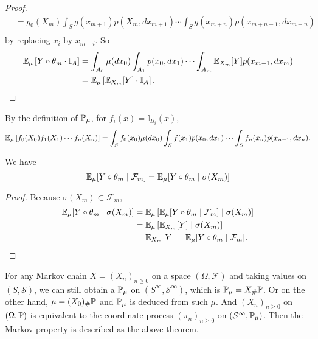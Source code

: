 \begin{proof}
\begin{equation*}
\begin{aligned}
            &=  g_0(X_m)\int_S g(x_{m+1})p(X_m,dx_{m+1}) \cdots \int_S g(x_{m+n})p(x_{m+n-1},dx_{m+n}) \\
        \end{aligned}
    \end{equation*}
    by replacing $x_i$ by $x_{m+i}$. So
    \begin{equation*}
        \begin{aligned}
            \mathbb{E}_\mu\left[Y\circ \theta_m \cdot \mathbb{I}_A\right] &= \int_{A_0}\mu(dx_0) \int_{A_1}p(x_0,dx_1)\cdots \int_{A_m}\mathbb{E}_{X_m}[Y]p(x_{m-1},dx_m) \\
            &=\mathbb{E}_\mu\left[\mathbb{E}_{X_m}[Y] \cdot \mathbb{I}_A\right].
        \end{aligned}\qedhere
    \end{equation*}
\end{proof}
\begin{rmk}
    By the definition of $\mathbb{P}_\mu$, for $f_i(x) = \mathbb{I}_{B_i}(x)$, 
    \begin{equation*}
        \mathbb{E}_\mu\left[f_0(X_0)f_1(X_1)\cdots f_n(X_n)\right] = \int_Sf_0(x_0)\mu(dx_0)\int_S f(x_1)p(x_0,dx_1)\cdots \int_S f_n(x_n)p(x_{n-1},dx_n).
    \end{equation*}
\end{rmk}

\begin{cor}
    We have
    \begin{equation*}
        \mathbb{E}_\mu[Y \circ \theta_m \mid \mathcal{F}_m] = \mathbb{E}_\mu[ Y\circ \theta_m \mid \sigma(X_m)]
    \end{equation*}
\end{cor}
\begin{proof}
    Because $\sigma(X_m) \subset \mathcal{F}_m$,
    \begin{equation*}
        \begin{aligned}
            \mathbb{E}_\mu[ Y\circ \theta_m \mid \sigma(X_m)] & = \mathbb{E}_\mu\left[\mathbb{E}_\mu[Y \circ \theta_m \mid \mathcal{F}_m] \mid \sigma(X_m) \right] \\
            &=  \mathbb{E}_\mu\left[\mathbb{E}_{X_m}[Y] \mid \sigma(X_m) \right] \\
            &= \mathbb{E}_{X_m}[Y] = \mathbb{E}_\mu[Y \circ \theta_m \mid \mathcal{F}_m].
        \end{aligned}\qedhere
    \end{equation*}
\end{proof}
\begin{rmk}
    For any Markov chain $X=(X_n)_{n \geq 0}$ on a space $(\Omega, \mathcal{F})$ and taking values on $(S, \mathcal{S})$, we can still obtain a $\mathbb{P}_\mu$ on $(S^\infty,\mathcal{S}^\infty)$, which is $\mathbb{P}_\mu = X_{\#}\mathbb{P}$. Or on the other hand, $\mu = (X_0)_{\#}\mathbb{P}$ and $\mathbb{P}_\mu$ is deduced from such $\mu$. And $(X_n)_{n \geq 0}$ on $(\Omega,\mathbb{P})$ is equivalent to the coordinate process $(\pi_n)_{n\geq 0}$ on $(\mathcal{S}^\infty, \mathbb{P}_\mu)$. Then the Markov property is described as the above theorem.
\end{rmk}
    

